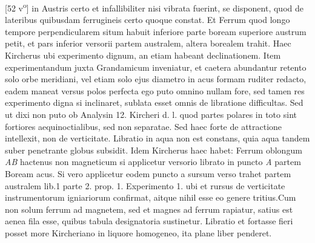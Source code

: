 [52 v\textsuperscript{o}] in Austris certo et infallibiliter nisi vibrata fuerint, se disponent, quod de lateribus quibusdam ferrugineis certo quoque  constat. Et Ferrum quod longo tempore perpendicularem situm habuit inferiore parte boream superiore austrum petit, et pars inferior versorii partem australem, altera borealem trahit. Haec Kircherus\protect{} ubi experimento dignum, an etiam habeant declinationem\protect{}. Item experimentandum   juxta Grandamicum\protect{} inveniatur, et caetera abundantur retento solo orbe meridiani\protect{}, vel etiam solo ejus diametro in acus\protect{} formam ruditer redacto, eadem maneat versus polos\protect{} perfecta  ego puto omnino nullam fore, sed tamen res experimento digna si inclinaret, sublata esset omnis de  libratione difficultas. Sed ut dixi non puto ob Analysin 12. Kircheri\protect{} d. l. quod partes polares in toto sint fortiores aequinoctialibus, sed non separatae. Sed haec forte de attractione intellexit, non de verticitate. Libratio in aqua non est constans, quia aqua tandem suber penetrante globus subsidit. Idem Kircherus\protect{} haec habet: Ferrum oblongum \textit{AB} hactenus non magneticum si applicetur versorio librato in puncto \textit{A}  partem Boream acus.\protect{} Si vero applicetur eodem puncto a sursum verso trahet partem australem lib.1 parte 2. prop. 1. Experimento 1. ubi et rursus de verticitate instrumentorum igniariorum confirmat, aitque nihil esse eo genere tritius.\pend \pstart Cum non solum ferrum ad magnetem\protect{}, sed et magnes\protect{} ad ferrum rapiatur, satius est aenea fila esse, quibus tabula designatoria sustinetur. Libratio et fortasse fieri posset more Kircheriano\protect{} in liquore homogeneo, ita plane liber penderet. 